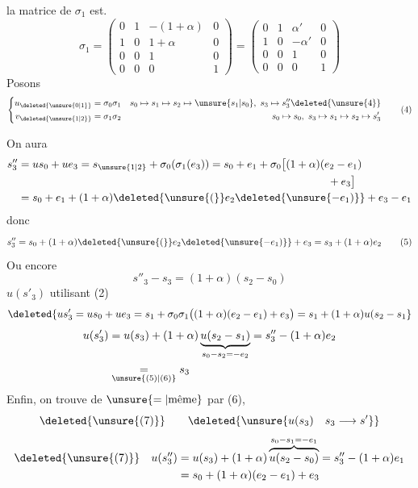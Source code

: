  la matrice de $\sigma_1$ est.
\[
\sigma_1=\begin{pmatrix}0&1&-(1+\alpha)&0\\1&0&1+\alpha&0\\0&0&1&0\\0&0&0&1\end{pmatrix}
=\begin{pmatrix}0&1&\alpha'&0\\1&0&-\alpha'&0\\0&0&1&0\\0&0&0&1\end{pmatrix}\tag*{(3)}
\]
Posons
\[
\left\{\begin{aligned}
u_{\deleted{\unsure{0|1}}}&=\sigma_0\sigma_1
& s_0\mapsto s_1\mapsto s_2\mapsto\unsure{s_1|s_0},\ s_3\mapsto s''_3\deleted{\unsure{4}}\\
v_{\deleted{\unsure{1|2}}}&=\sigma_1\sigma_2
& s_0\mapsto s_0,\ s_3\mapsto s_1\mapsto s_2\mapsto s'_3
\end{aligned}\right.\tag*{(4)}
\]

On aura
\[
\begin{aligned}
s''_3&=us_0+ue_3=s_{\unsure{1|2}}+\sigma_0(\sigma_1(e_3))=s_0+e_1+\sigma_0\bigl[(1+\alpha)(e_2-e_1)\\
&\hspace{10cm}+e_3\bigr]\\
&=s_0+e_1+(1+\alpha)\deleted{\unsure{(}}e_2\deleted{\unsure{-e_1)}}+e_3-e_1
\end{aligned}
\]
donc
\[
s''_3=s_0+(1+\alpha)\deleted{\unsure{(}}e_2\deleted{\unsure{-e_1)}}+e_3=s_3+(1+\alpha)e_2\tag*{(5)}
\]
Ou encore
\[
s''_3-s_3=(1+\alpha)(s_2-s_0)\tag*{(6)}
\]
 $u(s'_3)$ utilisant (2)
\[
\deleted{us'_3=us_0+ue_3=s_1+\sigma_0\sigma_1\bigl((1+\alpha)(e_2-e_1)+e_3\bigr)=s_1+(1+\alpha)u(s_2-s_1}
\]
\[
\begin{aligned}
u(s'_3)&=u(s_3)+(1+\alpha)\underbrace{u(s_2-s_1)}_{s_0-s_2=-e_2}=s''_3-(1+\alpha)e_2\\
&\underset{\unsure{(5)|(6)}}{=}s_3
\end{aligned}
\]
 Enfin, on trouve de $\unsure{=|\text{même}}$ par (6),
\[
\deleted{\unsure{(7)}}\qquad\deleted{\unsure{u(s_3)\quad s_3\longrightarrow s'}}
\]
\[
\begin{aligned}
\deleted{\unsure{(7)}}\quad u(s''_3)&=u(s_3)+(1+\alpha)\overbrace{u(s_2-s_0)}^{s_0-s_1=-e_1}=s''_3-(1+\alpha)e_1\\
&=s_0+(1+\alpha)(e_2-e_1)+e_3
\end{aligned}
\]
